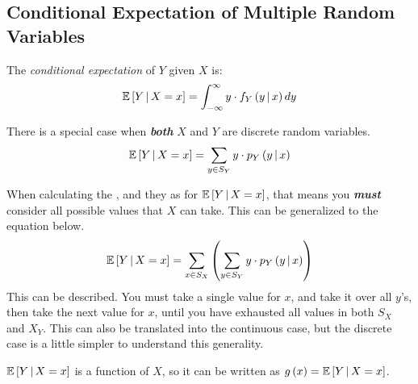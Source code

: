 	\subsection{Conditional Expectation of Multiple Random Variables} \label{subsec:Conditional Expectation of Multiple Variables}
		\begin{definition} \label{def:Conditional Expectation of Multiple Variables}
			The \emph{conditional expectation} of $Y$ given $X$ is:
			\begin{equation} \label{eq:Conditional Expectation of Multiple Variables}
				\operatorname{\operatorname{\mathbb{E}}} \left[ Y \operatorname{\vert} X=x \right] = \int_{-\infty}^{\infty} y \cdot f_{Y} \left( y \operatorname{\vert} x \right) dy
			\end{equation}
			\begin{remark}
				There is a special case when \emph{\textbf{both}} $X$ and $Y$ are discrete random variables.
				\begin{equation} \label{eq:Conditional Expectation of Multiple Discrete Variables}
					\operatorname{\operatorname{\mathbb{E}}} \left[ Y \operatorname{\vert} X=x \right] = \sum_{y \in S_{Y}} y \cdot p_{Y} \left( y \operatorname{\vert} x \right)
				\end{equation}
			\end{remark}
			\begin{remark}
				When calculating the , and they as for $\operatorname{\operatorname{\mathbb{E}}} \left[ Y \operatorname{\vert} X=x \right]$, that means you \emph{\textbf{must}} consider all possible values that $X$ can take.
				This can be generalized to the equation below.
				\begin{equation} \label{eq:General Conditional Expectation of Multiple Variables}
					\operatorname{\operatorname{\mathbb{E}}} \left[ Y \operatorname{\vert} X=x \right] = \sum_{x \in S_{X}} \left( \sum_{y \in S_{Y}} y \cdot p_{Y} \left( y \operatorname{\vert} x \right) \right)
				\end{equation}
				This can be described. You must take a single value for $x$, and take it over all $y$'s, then take the next value for $x$, until you have exhausted all values in both $S_{X}$ and $X_{Y}$. \newline
				This can also be translated into the continuous case, but the discrete case is a little simpler to understand this generality.
			\end{remark}
			\begin{remark}
				$\operatorname{\operatorname{\mathbb{E}}} \left[ Y \operatorname{\vert} X=x \right]$ is a function of $X$, so it can be written as $g \left( x \right) = \operatorname{\operatorname{\mathbb{E}}} \left[ Y \operatorname{\vert} X=x \right]$.

\end{remark}
\end{definition}
